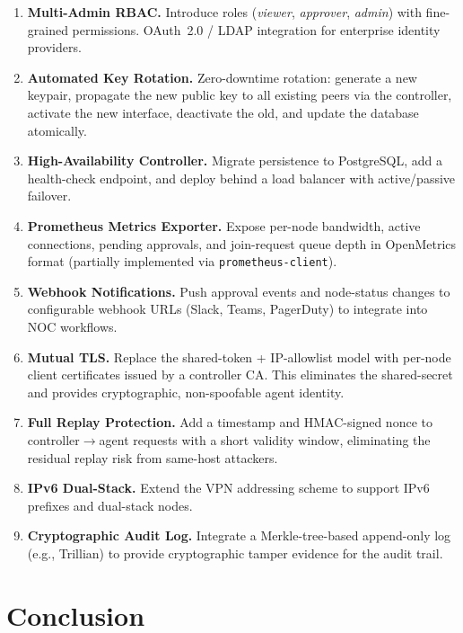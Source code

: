 \documentclass[conference]{IEEEtran}
\begin{document}
\begin{enumerate}
  \item \textbf{Multi-Admin RBAC.} Introduce roles (\textit{viewer},
        \textit{approver}, \textit{admin}) with fine-grained permissions.
        OAuth~2.0 / LDAP integration for enterprise identity providers.
  \item \textbf{Automated Key Rotation.} Zero-downtime rotation: generate a new
        keypair, propagate the new public key to all existing peers via the
        controller, activate the new interface, deactivate the old, and update
        the database atomically.
  \item \textbf{High-Availability Controller.} Migrate persistence to
        PostgreSQL, add a health-check endpoint, and deploy behind a load
        balancer with active/passive failover.
  \item \textbf{Prometheus Metrics Exporter.} Expose per-node bandwidth, active
        connections, pending approvals, and join-request queue depth in
        OpenMetrics format (partially implemented via \texttt{prometheus-client}).
  \item \textbf{Webhook Notifications.} Push approval events and node-status
        changes to configurable webhook URLs (Slack, Teams, PagerDuty) to
        integrate into NOC workflows.
  \item \textbf{Mutual TLS.} Replace the shared-token + IP-allowlist model with
        per-node client certificates issued by a controller CA. This eliminates
        the shared-secret and provides cryptographic, non-spoofable agent identity.
  \item \textbf{Full Replay Protection.} Add a timestamp and HMAC-signed nonce to
        controller$\rightarrow$agent requests with a short validity window,
        eliminating the residual replay risk from same-host attackers.
  \item \textbf{IPv6 Dual-Stack.} Extend the VPN addressing scheme to support
        IPv6 prefixes and dual-stack nodes.
  \item \textbf{Cryptographic Audit Log.} Integrate a Merkle-tree-based
        append-only log (e.g., Trillian) to provide cryptographic tamper
        evidence for the audit trail.
\end{enumerate}


\section{Conclusion}
\label{sec:conclusion}
\end{document}
